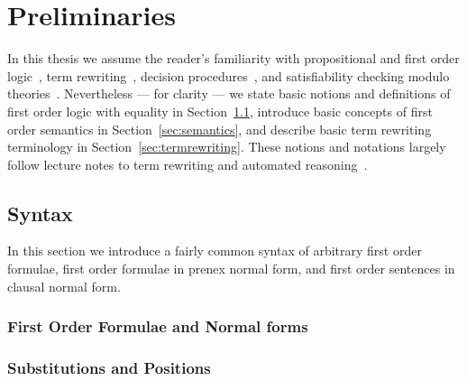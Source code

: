 
\chapter{Preliminaries}

%

In this thesis we assume the reader's familiarity with
propositional and first order logic~\cite{Huth:2004:LCS:975331},
term rewriting~\cite{Baader:1998:TR:280474},
decision procedures~\cite{Kroening:2008:DPA:1391237},
and satisfiability checking modulo theories~\cite{Biere:2009:HSV:1550723}.
Nevertheless --- for clarity --- we state basic notions and  definitions
of first order logic with equality in Section~\ref{sec:syntax},
introduce basic concepts of first order semantics in Section~\ref{sec:semantics},
and describe basic term rewriting terminology in Section~\ref{sec:termrewriting}.
These notions and notations largely follow lecture notes to term rewriting and automated reasoning~\cite{AM2015tr, GM2013ar}.

\section{Syntax}\label{sec:syntax}

In this section we introduce a fairly common syntax of 
arbitrary first order formulae,
first order formulae in prenex normal form,
and first order sentences in clausal normal form.







\subsection{First Order Formulae and Normal forms}





\subsection{Substitutions and Positions}

